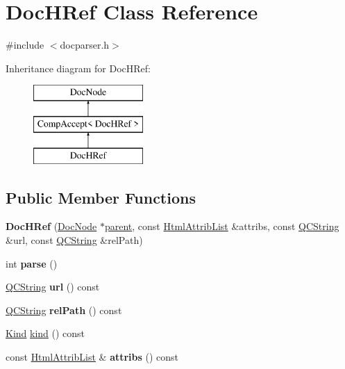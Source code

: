 \hypertarget{class_doc_h_ref}{}\section{Doc\+H\+Ref Class Reference}
\label{class_doc_h_ref}


{\ttfamily \#include $<$docparser.\+h$>$}

Inheritance diagram for Doc\+H\+Ref\+:\begin{figure}[H]
\begin{center}
\leavevmode
\includegraphics[height=3.000000cm]{class_doc_h_ref}
\end{center}
\end{figure}
\subsection*{Public Member Functions}
\begin{DoxyCompactItemize}
\item 
\mbox{\label{class_doc_h_ref_a0817d8cdaaa3d691fc5b55f24db0798d}} 
{\bfseries Doc\+H\+Ref} (\mbox{\hyperlink{class_doc_node}{Doc\+Node}} $\ast$\mbox{\hyperlink{class_doc_node_a73e8ad29a91cfceb0968eb00db71a23d}{parent}}, const \mbox{\hyperlink{class_html_attrib_list}{Html\+Attrib\+List}} \&attribs, const \mbox{\hyperlink{class_q_c_string}{Q\+C\+String}} \&url, const \mbox{\hyperlink{class_q_c_string}{Q\+C\+String}} \&rel\+Path)
\item 
\mbox{\label{class_doc_h_ref_a07934cfcbc2cfb3709b90915cf087135}} 
int {\bfseries parse} ()
\item 
\mbox{\label{class_doc_h_ref_a5413d17bd302ad2e43057488bdd96175}} 
\mbox{\hyperlink{class_q_c_string}{Q\+C\+String}} {\bfseries url} () const
\item 
\mbox{\label{class_doc_h_ref_a874e1b84a9041c4b4801a7a586045cda}} 
\mbox{\hyperlink{class_q_c_string}{Q\+C\+String}} {\bfseries rel\+Path} () const
\item 
\mbox{\hyperlink{class_doc_node_aebd16e89ca590d84cbd40543ea5faadb}{Kind}} \mbox{\hyperlink{class_doc_h_ref_a19a1050d1b9c755f3d76dce4f8d5a4df}{kind}} () const
\item 
\mbox{\label{class_doc_h_ref_a3f92cdf74be59a48a79f1fbd5dac40d6}} 
const \mbox{\hyperlink{class_html_attrib_list}{Html\+Attrib\+List}} \& {\bfseries attribs} () const
\end{DoxyCompactItemize}
